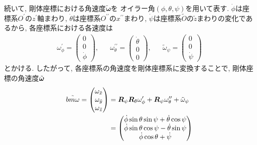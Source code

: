 続いて, 剛体座標における角速度$\tilde{\bm{\omega}}$を
オイラー角$(\phi,\theta,\psi)$を用いて表す. 
$\dot{\phi}$は座標系$O^{\prime}$の$z^{\prime}$軸まわり,
$\dot{\theta}$は座標系$O^{\prime \prime}$の$x^{\prime \prime}$まわり, 
$\dot{\psi}$は座標系$\tilde{O}$の$\tilde{z}$まわりの変化であるから, 各座標系における各速度は
\begin{align}
 \omega_{\phi}^{\prime}
 =
 \begin{pmatrix}
  0 \\ 0 \\ \dot{\phi}
 \end{pmatrix}
 , &&
  \omega_{\theta}^{\prime \prime}
 =
 \begin{pmatrix}
  \dot{\theta} \\ 0 \\ 0
 \end{pmatrix}
 , &&
  \tilde{\omega}_{\psi}
 =
 \begin{pmatrix}
  0 \\ 0 \\ \dot{\psi}
 \end{pmatrix}
 \label{eq:RigidBodyMD5}
\end{align}
とかける. 
したがって, 各座標系の角速度を剛体座標系に変換することで, 剛体座標の角速度$\Tilde{\bm{\omega}}$
\begin{align}
 \tilde{bm{\omega}}
 =
 \begin{pmatrix}
  \omega_{\tilde{x}} \\
  \omega_{\tilde{y}} \\
  \omega_{\tilde{z}} \\
 \end{pmatrix}
 &=
   \bm{R}_{\psi}\bm{R}_{\theta}\omega_{\phi}^{\prime}
 + \bm{R}_{\psi}\omega_{\theta}^{\prime \prime}
 + \tilde{\omega}_{\psi}
 \notag
 \\
 &=
 \begin{pmatrix}
  \dot{\phi}\sin\theta \sin\psi + \dot{\theta}\cos\psi \\
  \dot{\phi}\sin\theta \cos\psi - \dot{\theta}\sin\psi \\
  \dot{\phi}\cos\theta + \dot{\psi}
 \end{pmatrix}
 \label{eq:RigidBodyMD6}
\end{align}
